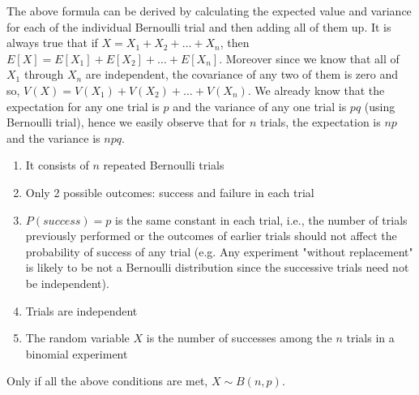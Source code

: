 The above formula can be derived by calculating the expected value and variance for each of the individual Bernoulli trial and then adding all of them up. It is always true that if $X = X_1 + X_2 + \dots + X_n$, then $E[X] = E[X_1] + E[X_2] + \dots + E[X_n]$. Moreover since we know that all of $X_1$ through $X_n$ are independent, the covariance of any two of them is zero and so, $V(X) = V(X_1) + V(X_2) + \dots + V(X_n)$. We already know that the expectation for any one trial is $p$ and the variance of any one trial is $pq$ (using Bernoulli trial), hence we easily observe that for $n$ trials, the expectation is $np$ and the variance is $npq$.
\begin{note}
\end{note}
\begin{enumerate}
    \item It consists of $n$ repeated Bernoulli trials
    \item Only 2 possible outcomes: success and failure in each trial
    \item $P(success) = p$ is the same constant in each trial, i.e., the number of trials previously performed or the outcomes of earlier trials should not affect the probability of success of any trial (e.g. Any experiment "without replacement" is likely to be not a Bernoulli distribution since the successive trials need not be independent). 
    \item Trials are independent
    \item The random variable $X$ is the number of successes among the $n$ trials in a binomial experiment
\end{enumerate}
Only if all the above conditions are met, $X \sim B(n,p)$.

